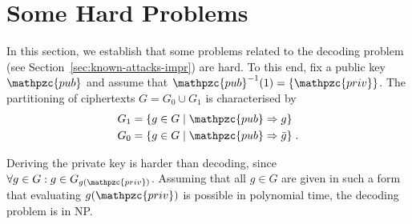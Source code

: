 \documentclass[final,journal,compsoc]{IEEEtran}
\newcommand{\priv}{\mathpzc{priv}}
\newcommand{\pub}{\mathpzc{pub}}
\begin{document}
\clearpage
\appendices 

\section{Some Hard Problems\label{sec:some-hard-problems}}

In this section, we establish that some problems related to the
decoding problem (see Section~\ref{sec:known-attacks-impr}) are hard.
To this end, fix a public key $\pub$ and assume that
$\pub^{-1}(1)=\{\priv\}$. The partitioning of ciphertexts $G=G_0\cup G_1$ is characterised by
\begin{align}
G_1 &= \{ g \in G \; | \; \pub \Rightarrow g \}\\
G_0 &= \{ g \in G \; | \; \pub \Rightarrow \bar g \} \;.
\end{align}

Deriving the private key is harder than decoding, since $\forall g\in
G : g\in G_{g(\priv)}$. Assuming that all $g \in G$ are given in
such a form that evaluating $g(\priv)$ is possible in polynomial time, the decoding problem is in NP.
\end{document}
